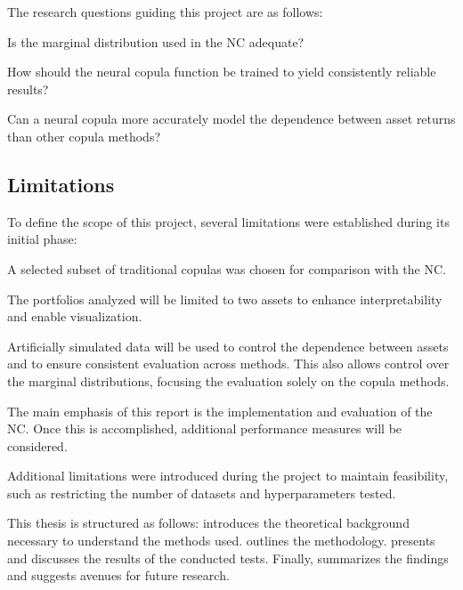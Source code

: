The research questions guiding this project are as follows:
\begin{compactenum}[{\bfseries RQ}1]
    \item \label{item:RQ1} Is the marginal distribution used in the \gls{NC} adequate?
    \item \label{item:RQ2} How should the neural copula function be trained to yield consistently reliable results?
    \item \label{item:RQ3} Can a neural copula more accurately model the dependence between asset returns than other copula methods?
\end{compactenum}
\newcommand{\RQone}{{\bfseries RQ}\ref{item:RQ1} }
\newcommand{\RQtwo}{{\bfseries RQ}\ref{item:RQ2} }
\newcommand{\RQthree}{{\bfseries RQ}\ref{item:RQ3} }

\subsection{Limitations}\label{Limitations}
To define the scope of this project, several limitations were established during its initial phase:

\begin{compactenum}
    \item A selected subset of traditional copulas was chosen for comparison with the \gls{NC}.
    \item The portfolios analyzed will be limited to two assets to enhance interpretability and enable visualization.
    \item Artificially simulated data will be used to control the dependence between assets and to ensure consistent evaluation across methods. This also allows control over the marginal distributions, focusing the evaluation solely on the copula methods.
    \item The main emphasis of this report is the implementation and evaluation of the \gls{NC}. Once this is accomplished, additional performance measures will be considered.
\end{compactenum}

Additional limitations were introduced during the project to maintain feasibility, such as restricting the number of datasets and hyperparameters tested.

This thesis is structured as follows:  introduces the theoretical background necessary to understand the methods used.  outlines the methodology.  presents and discusses the results of the conducted tests. Finally,  summarizes the findings and suggests avenues for future research.




